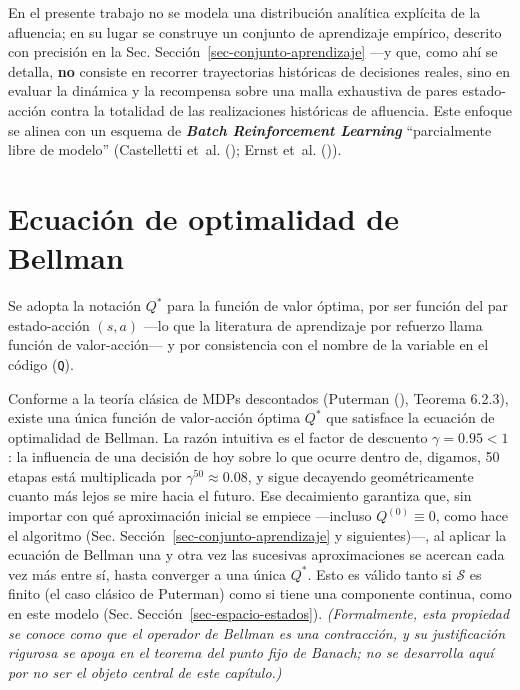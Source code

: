 \documentclass[
  spanish,
  letterpaper,
]{scrreprt}
\theoremstyle{definition}
\theoremstyle{remark}
\begin{document}
En el presente trabajo no se modela una distribución analítica explícita
de la afluencia; en su lugar se construye un conjunto de aprendizaje
empírico, descrito con precisión en la Sec.
Sección~\ref{sec-conjunto-aprendizaje} ---y que, como ahí se detalla,
\textbf{no} consiste en recorrer trayectorias históricas de decisiones
reales, sino en evaluar la dinámica y la recompensa sobre una malla
exhaustiva de pares estado-acción contra la totalidad de las
realizaciones históricas de afluencia. Este enfoque se alinea con un
esquema de \textbf{\emph{Batch Reinforcement Learning}} ``parcialmente
libre de modelo'' (Castelletti et~al.
(); Ernst et~al.
()).

\section{Ecuación de optimalidad de
Bellman}\label{ecuaciuxf3n-de-optimalidad-de-bellman}

Se adopta la notación \(Q^*\) para la función de valor óptima, por ser
función del par estado-acción \((s,a)\) ---lo que la literatura de
aprendizaje por refuerzo llama función de valor-acción--- y por
consistencia con el nombre de la variable en el código (\texttt{Q}).

Conforme a la teoría clásica de MDPs descontados (Puterman
(), Teorema 6.2.3), existe una
única función de valor-acción óptima \(Q^*\) que satisface la ecuación
de optimalidad de Bellman. La razón intuitiva es el factor de descuento
\(\gamma=0.95<1\): la influencia de una decisión de hoy sobre lo que
ocurre dentro de, digamos, 50 etapas está multiplicada por
\(\gamma^{50}\approx0.08\), y sigue decayendo geométricamente cuanto más
lejos se mire hacia el futuro. Ese decaimiento garantiza que, sin
importar con qué aproximación inicial se empiece ---incluso
\(Q^{(0)}\equiv0\), como hace el algoritmo (Sec.
Sección~\ref{sec-conjunto-aprendizaje} y siguientes)---, al aplicar la
ecuación de Bellman una y otra vez las sucesivas aproximaciones se
acercan cada vez más entre sí, hasta converger a una única \(Q^*\). Esto
es válido tanto si \(\mathcal S\) es finito (el caso clásico de
Puterman) como si tiene una componente continua, como en este modelo
(Sec. Sección~\ref{sec-espacio-estados}). \emph{(Formalmente, esta
propiedad se conoce como que el operador de Bellman es una contracción,
y su justificación rigurosa se apoya en el teorema del punto fijo de
Banach; no se desarrolla aquí por no ser el objeto central de este
capítulo.)}
\end{document}
